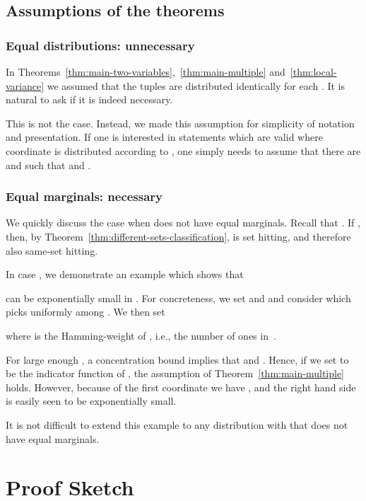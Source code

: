 \documentclass{daj}
\newcommand{\1}{\mathbbm{1}}
\theoremstyle{plain}
\theoremstyle{definition}
\begin{document}
\subsection{Assumptions of the theorems}

\subsubsection{Equal distributions: unnecessary}
\label{sec:equal-distributions}
In Theorems~\ref{thm:main-two-variables},~\ref{thm:main-multiple}
and~\ref{thm:local-variance}  we assumed that the tuples 
 are distributed 
identically for each .
It is natural to ask if it is indeed necessary.

This is not the case.
Instead, we made this assumption for simplicity of notation and presentation.
If one is interested in statements which are valid where coordinate
 is distributed according to , one simply needs
to assume that there are   and  such 
that
 and .


\subsubsection{Equal marginals: necessary}
\label{sec:differentMarginals}

We quickly discuss the case when  does not have equal marginals.
Recall that . If , then,
by Theorem~\ref{thm:different-sets-classification},  is set hitting,
and therefore also same-set hitting.

In case , we demonstrate an example which shows that 
 
can be exponentially small in . 
For concreteness, we set  and  
and consider  which picks uniformly
among .
We then set \newcommand{\wt}{\mathrm{wt}}

where  is the Hamming-weight of , i.e., the number of ones
in~.

For large enough , a concentration bound 
implies that  
and .
Hence, if we set  to be the indicator function of , 
the assumption of Theorem~\ref{thm:main-multiple} holds.
However, because of the first coordinate we have
,
and the right hand side is easily seen to be exponentially
small.

It is not difficult to extend this example to any distribution 
with  that does not
have equal marginals.

\section{Proof Sketch}
\label{sec:proof-sketch}
\end{document}
